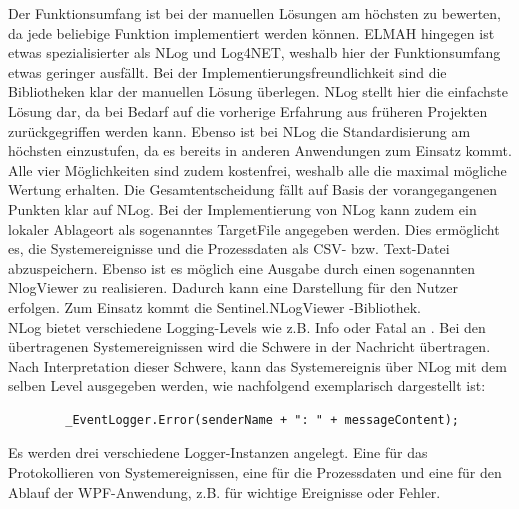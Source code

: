 \documentclass[ a4paper,
                oneside,
                toc=bibliography,
                toc=listof
                ]{scrbook}
\begin{document}
   	Der Funktionsumfang ist bei der manuellen Lösungen am höchsten zu bewerten, da jede beliebige Funktion implementiert werden können. ELMAH hingegen ist etwas spezialisierter als NLog und Log4NET, weshalb hier der Funktionsumfang etwas geringer ausfällt. Bei der Implementierungsfreundlichkeit sind die Bibliotheken klar der manuellen Lösung überlegen. NLog stellt hier die einfachste Lösung dar, da bei Bedarf auf die vorherige Erfahrung aus früheren Projekten zurückgegriffen werden kann. Ebenso ist bei NLog die Standardisierung am höchsten einzustufen, da es bereits in anderen Anwendungen zum Einsatz kommt. Alle vier Möglichkeiten sind zudem kostenfrei, weshalb alle die maximal mögliche Wertung erhalten. Die Gesamtentscheidung fällt auf Basis der vorangegangenen Punkten klar auf NLog.
   	Bei der Implementierung von NLog kann zudem ein lokaler Ablageort als sogenanntes TargetFile angegeben werden. Dies ermöglicht es, die Systemereignisse und die Prozessdaten als CSV- bzw. Text-Datei abzuspeichern. Ebenso ist es möglich eine Ausgabe durch einen sogenannten NlogViewer zu realisieren. Dadurch kann eine Darstellung für den Nutzer erfolgen. Zum Einsatz kommt die \glqq Sentinel.NLogViewer \grqq{}-Bibliothek.\\
   	NLog bietet verschiedene \glqq Logging-Levels \grqq{} wie z.B. Info oder Fatal an \cite{nlog}. Bei den übertragenen Systemereignissen wird die Schwere in der Nachricht übertragen. Nach Interpretation dieser Schwere, kann das Systemereignis über NLog mit dem selben Level ausgegeben werden, wie nachfolgend exemplarisch dargestellt ist:
   	\begin{lstlisting}
   		_EventLogger.Error(senderName + ": " + messageContent);
   	\end{lstlisting}
   	Es werden drei verschiedene Logger-Instanzen angelegt. Eine für das Protokollieren von Systemereignissen, eine für die Prozessdaten und eine für den Ablauf der WPF-Anwendung, z.B. für wichtige Ereignisse oder Fehler.
\end{document}
